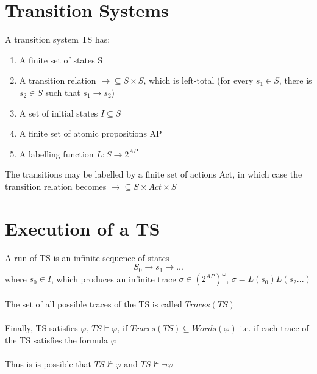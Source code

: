 \documentclass{article}[18pt]
\begin{document}
\section{Transition Systems}
A transition system TS has:
\begin{enumerate}
	\item A finite set of states S
	\item A transition relation $\rightarrow \subseteq S\times S$, which is left-total (for every $s_1\in S$, there is $s_2\in S$ such that $s_1\rightarrow s_2$)
	\item A set of initial states $I\subseteq S$
	\item A finite set of atomic propositions AP
	\item A labelling function $L:S\rightarrow 2^{AP}$
\end{enumerate}
The transitions may be labelled by a finite set of actions Act, in which case the transition relation becomes $\rightarrow \subseteq S\times Act \times S$
\section{Execution of a TS}
A run of TS is an infinite sequence of states
$$S_0\rightarrow s_1 \rightarrow ...$$
where $s_0\in I$, which produces an infinite trace $\sigma \in (2^{AP})^\omega$, $\sigma=L(s_0)L(s_2...)$\\
\\
The set of all possible traces of the TS is called $Traces(TS)$\\
\\
Finally, TS satisfies $\varphi$, $TS\models \varphi$, if $Traces(TS)\subseteq Words(\varphi)$ i.e. if each trace of the TS satisfies the formula $\varphi$\\
\\
Thus is is possible that $TS\not\models \varphi$ and $TS \not\models \lnot \varphi$
\end{document}
